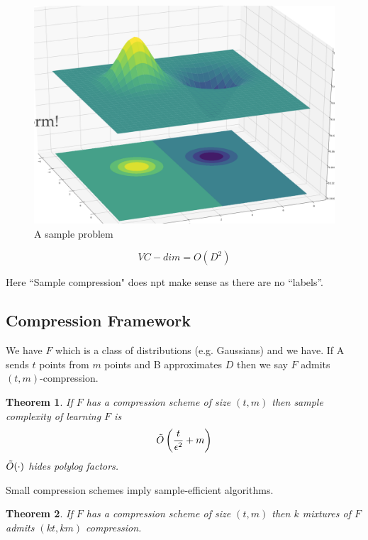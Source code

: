 \documentclass{article}
\newtheorem{theorem}{Theorem}
\begin{document}
\begin{figure}[h]
\centering
\includegraphics[scale=0.6]{media/example-problem.png}
\caption{A sample problem}
\label{fig:ex-problem}
\end{figure}

\begin{equation*}
    VC-dim=O(D^2)
\end{equation*}

\noindent Here “Sample compression" does npt make sense as there are no “labels”.

\subsection{Compression Framework}

\noindent We have $F$ which is a class of distributions (e.g. Gaussians) and we have. If A sends $t$ points from $m$ points and B approximates $D$
then we say $F$ admits $(t,m)$-compression.

\begin{theorem}
    If $F$ has a compression scheme of size $(t,m)$ then sample complexity of learning $F$ is
    \begin{equation*}
        \Tilde{O} \left( \frac{t}{\epsilon^2} + m \right)
    \end{equation*}
    $\Tilde{O}(\cdot)$ hides polylog factors.
\end{theorem}

\noindent Small compression schemes imply sample-efficient algorithms.

\begin{theorem}
    If $F$ has a compression scheme of size $(t, m)$ then $k$ mixtures of $F$ admits $(kt,km)$ compression.
\end{theorem}
\end{document}
